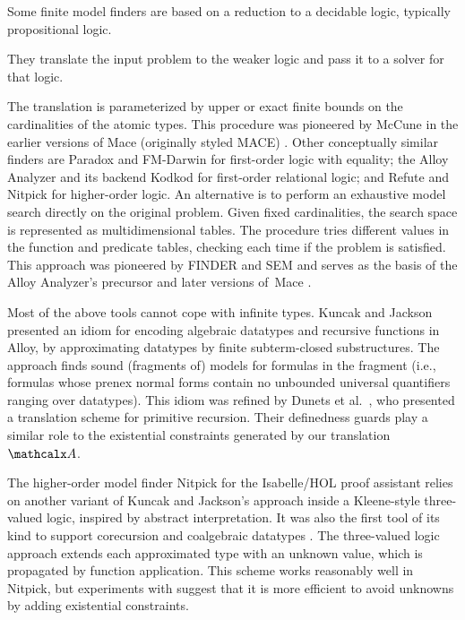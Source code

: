 Some finite model finders are based on a reduction to a decidable logic,
typically propositional logic. \begin{rep}They translate the input problem to the weaker
logic and pass it to a solver for that logic.\end{rep}
The translation is parameterized by upper or exact finite bounds on
the cardinalities of the atomic types. This procedure was pioneered by McCune
in the earlier versions of Mace (originally styled MACE) \cite{mccune-1994}.
Other conceptually similar finders are Paradox \cite{claessen-sorensson-2003}
and FM-Darwin \cite{baumgartner-et-al-2009} for first-order logic with
equality; the Alloy Analyzer and its backend Kodkod \cite{torlak-jackson-2007}
for first-order relational logic; and Refute \cite{weber-2008} and Nitpick
\cite{blanchette-nipkow-2010} for higher-order logic.
%
An alternative is to perform
an exhaustive model search directly on the original problem. Given fixed
cardinalities, the search space is represented as multidimensional
tables. The procedure tries different values in the function and predicate
tables, checking each time if the problem is satisfied.
This approach was pioneered by FINDER
\cite{slaney-1994} and SEM \cite{zhang-zhang-1995} and serves as
the basis of the Alloy Analyzer's precursor
\cite{jackson-1996} and later versions of~Mace
\cite{mccune-prover9-mace4}.

Most of the above tools cannot cope with infinite types.
Kuncak and Jackson \cite{kuncak-jackson-2005} presented an idiom for
encoding algebraic datatypes and recursive functions in Alloy, by
approximating datatypes by finite subterm-closed substructures.
The approach finds sound (fragments of) models for formulas in the
 fragment 
(i.e., formulas whose prenex normal forms contain no unbounded universal
quantifiers ranging over datatypes). This idiom was refined by Dunets
et al.\ \cite{dunets-et-al-2010}, who presented a translation scheme
for primitive recursion. Their definedness guards play a similar role to the
existential constraints generated by our translation $\conv$.

The higher-order model finder Nitpick \cite{blanchette-nipkow-2010}
for the Isabelle/HOL proof assistant
relies on another variant of Kuncak and Jackson's approach inside a
Kleene-style three-valued logic, inspired by abstract interpretation.
It was also the first tool of its kind to support corecursion and
coalgebraic datatypes \cite{blanchette-2013-relational}.
The three-valued logic approach extends each
approximated type with an unknown value, which is propagated by function
application. This scheme works reasonably well in Nitpick,
but experiments with \cvc suggest that it is more efficient to avoid
unknowns by adding existential constraints.

